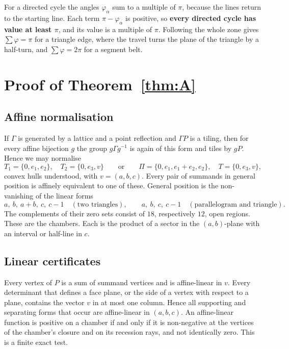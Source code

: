 \documentclass[11pt]{amsart}
\theoremstyle{definition}
\begin{document}
For a directed cycle the angles $\varphi_\alpha$ sum to a multiple of $\pi$, because the lines return to the starting
line. Each term $\pi-\varphi_\alpha$ is positive, so \textbf{every directed cycle has value at least $\pi$}, and its
value is a multiple of $\pi$. Following the whole zone gives $\sum \varphi = \pi$ for a triangle edge, where the
travel turns the plane of the triangle by a half-turn, and $\sum\varphi = 2\pi$ for a segment belt.

\section{Proof of Theorem~\ref{thm:A}}\label{sec:A}

\subsection{Affine normalisation}
If $\Gamma$ is generated by a lattice and a point reflection and $\Gamma P$ is a tiling, then for every affine
bijection $g$ the group $g\Gamma g^{-1}$ is again of this form and tiles by $gP$. Hence we may normalise
\[
T_1=\{0,e_1,e_2\},\quad T_2=\{0,e_3,v\}\qquad\text{or}\qquad
\Pi=\{0,e_1,e_1+e_2,e_2\},\quad T=\{0,e_3,v\},
\]
convex hulls understood, with $v=(a,b,c)$. Every pair of summands in general position is affinely equivalent to
one of these. General position is the non-vanishing of the linear forms
\[
a,\ b,\ a+b,\ c,\ c-1 \quad(\text{two triangles}),\qquad a,\ b,\ c,\ c-1 \quad (\text{parallelogram and triangle}).
\]
The complements of their zero sets consist of $18$, respectively $12$, open regions. These are the chambers. Each is the product of a sector in the $(a,b)$-plane with an
interval or half-line in $c$.

\subsection{Linear certificates}
Every vertex of $P$ is a sum of summand vertices and is affine-linear in $v$. Every determinant that defines a face
plane, or the side of a vertex with respect to a plane, contains the vector $v$ in at most one column. Hence all
supporting and separating forms that occur are affine-linear in $(a,b,c)$. An affine-linear function is positive on a
chamber if and only if it is non-negative at the vertices of the chamber's closure and on its recession rays, and not
identically zero. This is a finite exact test.
\end{document}
